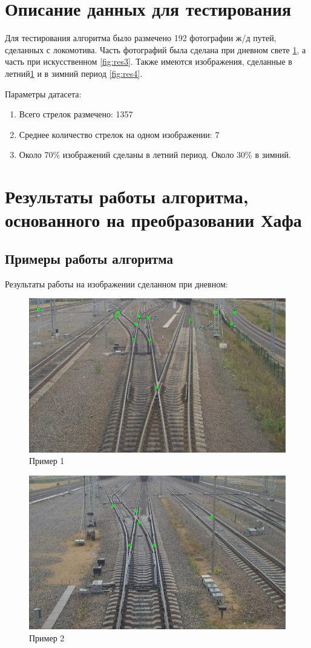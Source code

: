 \section{Описание данных для тестирования}
Для тестирования алгоритма было размечено 192 фотографии ж/д путей, сделанных с локомотива. Часть фотографий была сделана при дневном свете \ref{fig:res1}, а часть при искусственном \ref{fig:res3}. Также имеются изображения, сделанные в летний\ref{fig:res1} и в зимний период \ref{fig:res4}.

Параметры датасета:
\begin{enumerate}
	\item Всего стрелок размечено: 1357
	\item Среднее количество стрелок на одном изображении: 7
	\item Около 70\% изображений сделаны в летний период. Около 30\% в зимний.
\end{enumerate}

\section{Результаты работы алгоритма, основанного на преобразовании Хафа}
\subsection{Примеры работы алгоритма}
Результаты работы на изображении сделанном при дневном:
\begin{figure}[!h]
	\centering
	\includegraphics[width=0.7\linewidth]{pictures/screenshot0015}
	\caption{Пример 1}
	\label{fig:res1}
\end{figure}
\begin{figure}[!h]
	\centering
	\includegraphics[width=0.7\linewidth]{pictures/screenshot0016}
	\caption{Пример 2}
	\label{fig:res2}
\end{figure}
\newpage

